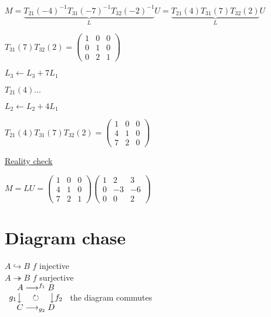 \documentclass{article}
\begin{document}
\centerline{$M=\underbrace{T_{21}(-4)^{-1}T_{31}(-7)^{-1}T_{32}(-2)^{-1}}_L U=\underbrace{T_{21}(4)T_{31}(7)T_{32}(2)}_L U$}

$T_{31}(7)T_{32}(2) = \left(\begin{array}{ccc}
    1 & 0 & 0 \\
    0 & 1 & 0 \\
    0 & 2 & 1
\end{array}\right)$

$L_3\leftarrow L_3 + 7 L_1$

$T_{21}(4)...$

$L_2\leftarrow L_2 + 4 L_1$

$T_{21}(4) T_{31}(7) T_{32}(2)=
\left(\begin{array}{ccc}
    1 & 0 & 0 \\
    4 & 1 & 0 \\
    7 & 2 & 0
\end{array}\right)$

\underline{Reality check }

$M = LU =
\begin{pmatrix}
    1 & 0 & 0 \\
    4 & 1 & 0 \\
    7 & 2 & 1
\end{pmatrix}
\begin{pmatrix}
    1 & 2 & 3 \\
    0 & -3 & -6 \\
    0 & 0 & 2
\end{pmatrix}
$

\section{Diagram chase}

$A\hookrightarrow B$ $f$ injective \\

\noindent$A\twoheadrightarrow B$ $f$ surjective \\

\hspace{-16pt}$\begin{array}{c}
    A \longrightarrow^{f_1} B \\
    g_1\big\downarrow \hspace{10pt} \circlearrowright \hspace{10pt}\big\downarrow f_2 \\
    C \longrightarrow_{g_2} D
\end{array}$ the diagram commutes
\end{document}
